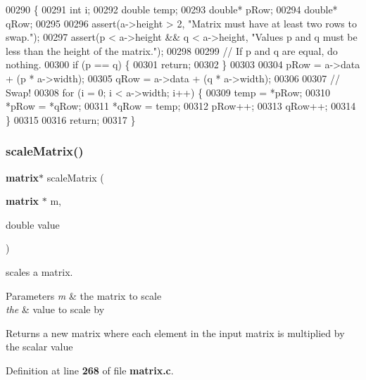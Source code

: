 \begin{DoxyCode}
00290                                       \{
00291     \textcolor{keywordtype}{int} i;
00292     \textcolor{keywordtype}{double} temp;
00293     \textcolor{keywordtype}{double}* pRow;
00294     \textcolor{keywordtype}{double}* qRow;
00295 
00296     assert(a->height > 2, \textcolor{stringliteral}{"Matrix must have at least two rows to swap."});
00297     assert(p < a->height && q < a->height, \textcolor{stringliteral}{"Values p and q must be less than the height of the matrix."});
00298 
00299     \textcolor{comment}{// If p and q are equal, do nothing.}
00300     \textcolor{keywordflow}{if} (p == q) \{
00301         \textcolor{keywordflow}{return};
00302     \}
00303 
00304     pRow = a->data + (p * a->width);
00305     qRow = a->data + (q * a->width);
00306 
00307     \textcolor{comment}{// Swap!}
00308     \textcolor{keywordflow}{for} (i = 0; i < a->width; i++) \{
00309         temp = *pRow;
00310         *pRow = *qRow;
00311         *qRow = temp;
00312         pRow++;
00313         qRow++;
00314     \}
00315 
00316     \textcolor{keywordflow}{return};
00317 \}
\end{DoxyCode}
\mbox{\label{matrix_8h_a6b7faa6ba9ee987d0777d9d0bd0e7b32}} 
\subsubsection{scale\+Matrix()}
{\footnotesize\ttfamily \textbf{ matrix}$\ast$ scale\+Matrix (\begin{DoxyParamCaption}\item[{\textbf{ matrix} $\ast$}]{m,  }\item[{double}]{value }\end{DoxyParamCaption})}



scales a matrix. 


\begin{DoxyParams}{Parameters}
{\em m} & the matrix to scale \\
\hline
{\em the} & value to scale by \\
\hline
\end{DoxyParams}
\begin{DoxyReturn}{Returns}
a new matrix where each element in the input matrix is multiplied by the scalar value 
\end{DoxyReturn}


Definition at line \textbf{ 268} of file \textbf{ matrix.\+c}.



